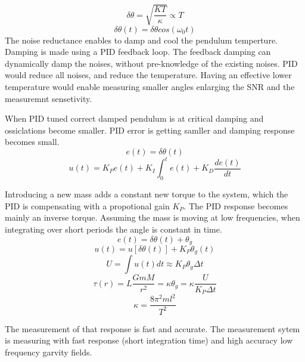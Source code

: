 \documentclass[\main/master.tex]{subfiles}
\begin{document}
\begin{equation}
\delta\theta = \sqrt{\frac{KT}{\kappa}}\propto{T}  \label{eqn:radiation force}
\end{equation}
\begin{equation}
\delta\theta(t) = \delta\theta cos(\omega_0 t)   \label{eqn:pid_error}
\end{equation}
The noise reductance enables to damp and cool the pendulum temperture. Damping is made using a PID feedback loop. The feedback damping can dynamically damp the noises, without pre-knowledge of the existing noises. PID would reduce all noises, and reduce the temperature. Having an effective lower temperature would enable measuring smaller angles enlarging the SNR and the measuremnt sensetivity.
\par\noindent
When PID tuned correct damped pendulum is at critical damping and ossiclations become smaller. PID error is getting samller and damping response becomes small. 
\begin{equation}
e(t) = \delta\theta(t)   \label{eqn:pid_error}
\end{equation}
\begin{equation}
u(t) = K_Pe(t)+K_I\int_{0}^{t}e(t)+K_D\frac{de(t)}{dt}   \label{eqn:PID_eq}
\end{equation}

Introducing a new mass adds a constant new torque to the system, which the PID is compensating with a propotional gain $K_P$. The PID response becomes mainly an inverse torque. Assuming the mass is moving at low frequencies, when integrating over short periods the angle is constant in time.
\begin{equation}
e(t) = \delta\theta(t) + \theta_g    \label{eqn:PID_measurement}
\end{equation}
\begin{equation}
u(t) = u[ \delta\theta(t)] + K_P\theta_g(t) \label{eqn:PID_measurement_eq}
\end{equation}
\begin{equation}
U = \int u(t)dt  \approx K_P\theta_g\Delta t \label{eqn:PID_measurement_eq}
\end{equation}
\begin{equation}
\tau(r) = L\frac{GmM}{r^2} =  \kappa\theta_g = \kappa\frac{U}{K_P\Delta t}      \label{eqn:pid_gravitation_torque}
\end{equation}
\begin{equation}
\kappa =\frac{8\pi^2ml^2}{T^2}    \label{eqn:empirical_torque}
\end{equation}

The measurement of that response is fast and accurate. The measurement sytem is measuring with fast response (short integration time) and high accuracy low frequency garvity fields. 

 
 
 
 
\end{document}
